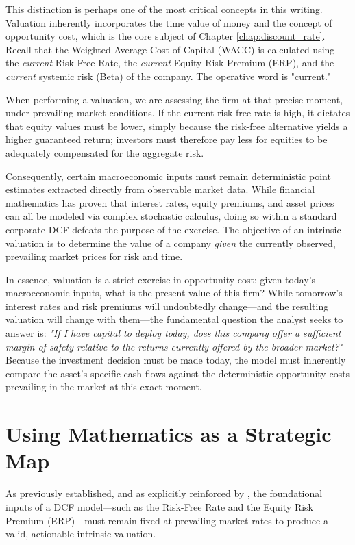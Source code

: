 This distinction is perhaps one of the most critical concepts in this writing. Valuation inherently incorporates the time value of money and the concept of opportunity cost, which is the core subject of Chapter \ref{chap:discount_rate}. Recall that the Weighted Average Cost of Capital (WACC) is calculated using the \textit{current} Risk-Free Rate, the \textit{current} Equity Risk Premium (ERP), and the \textit{current} systemic risk (Beta) of the company. The operative word is "current."

When performing a valuation, we are assessing the firm at that precise moment, under prevailing market conditions. If the current risk-free rate is high, it dictates that equity values must be lower, simply because the risk-free alternative yields a higher guaranteed return; investors must therefore pay less for equities to be adequately compensated for the aggregate risk.

Consequently, certain macroeconomic inputs must remain deterministic point estimates extracted directly from observable market data. While financial mathematics has proven that interest rates, equity premiums, and asset prices can all be modeled via complex stochastic calculus, doing so within a standard corporate DCF defeats the purpose of the exercise. The objective of an intrinsic valuation is to determine the value of a company \textit{given} the currently observed, prevailing market prices for risk and time.

In essence, valuation is a strict exercise in opportunity cost: given today's macroeconomic inputs, what is the present value of this firm? While tomorrow's interest rates and risk premiums will undoubtedly change—and the resulting valuation will change with them—the fundamental question the analyst seeks to answer is: \textit{"If I have capital to deploy today, does this company offer a sufficient margin of safety relative to the returns currently offered by the broader market?"} Because the investment decision must be made today, the model must inherently compare the asset's specific cash flows against the deterministic opportunity costs prevailing in the market at this exact moment.

\section*{Using Mathematics as a Strategic Map}

As previously established, and as explicitly reinforced by \textcite{damodaran2025investment}, the foundational inputs of a DCF model—such as the Risk-Free Rate and the Equity Risk Premium (ERP)—must remain fixed at prevailing market rates to produce a valid, actionable intrinsic valuation.


